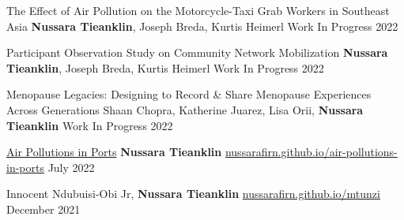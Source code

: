 

\begin{cventries}

\cvpub
    {The Effect of Air Pollution on the Motorcycle-Taxi Grab Workers in Southeast Asia} %
    {\textbf{Nussara Tieanklin}, Joseph Breda, Kurtis Heimerl} %
    {Work In Progress} %
    {2022} %


\cvpub
    {Participant Observation Study on Community Network Mobilization} %
    {\textbf{Nussara Tieanklin}, Joseph Breda, Kurtis Heimerl} %
    {Work In Progress} %
    {2022} %
   
   

\cvpub
    {Menopause Legacies: Designing to Record \& Share Menopause Experiences Across Generations} %
    {Shaan Chopra, Katherine Juarez, Lisa Orii, \textbf{Nussara Tieanklin}} %
    {Work In Progress} %
    {2022} %
   


\cvpub
      { \href{https://nussarafirn.github.io/air-pollutions-in-ports}{Air Pollutions in Ports}} %
    {\textbf{Nussara Tieanklin}} %
    { \href{https://nussarafirn.github.io/air-pollutions-in-ports}{nussarafirn.github.io/air-pollutions-in-ports}} %
    {July 2022} %

\cvpub
    {} %
    {Innocent Ndubuisi-Obi Jr, \textbf{Nussara Tieanklin}} %
    { \href{https://nussarafirn.github.io/mtunzi}{nussarafirn.github.io/mtunzi}} %
    {December 2021} %


\end{cventries}
